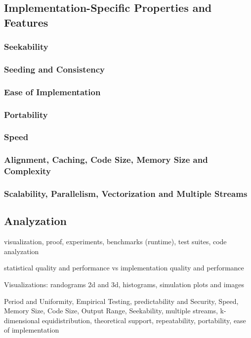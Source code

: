 \documentclass{stdlocal}
\begin{document}
  \subsection{Implementation-Specific Properties and Features}
  \subsubsection{Seekability}
  \subsubsection{Seeding and Consistency}
  \subsubsection{Ease of Implementation}
  \subsubsection{Portability}
  \subsubsection{Speed}
  \subsubsection{Alignment, Caching, Code Size, Memory Size and Complexity}
  \subsubsection{Scalability, Parallelism, Vectorization and Multiple Streams}

  \subsection{Analyzation}
  visualization, proof, experiments, benchmarks (runtime), test suites, code analyzation

  statistical quality and performance vs implementation quality and performance

  Visualizations: randograms 2d and 3d, histograms, simulation plots and images

  Period and Uniformity, Empirical Testing, predictability and Security, Speed, Memory Size, Code Size, Output Range, Seekability, multiple streams, k-dimensional equidistribution, theoretical support, repeatability, portability, ease of implementation
\end{document}
